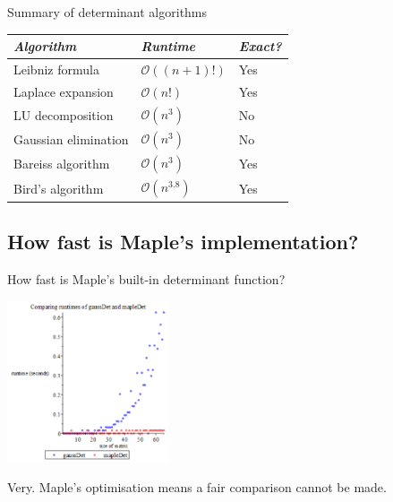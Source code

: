 \documentclass{beamer}
\begin{document}
\begin{frame}{Summary of determinant algorithms}

    \begin{center}
        \begin{tabular}{l l l}
            \toprule
            \emph{Algorithm}     & \emph{Runtime}           & \emph{Exact?} \\
            \midrule
            Leibniz formula      & $\mathcal{O}((n+1)!)$    & Yes \\
            Laplace expansion    & $\mathcal{O}(n!)$        & Yes \\
            LU decomposition     & $\mathcal{O}(n^3)$       & No \\
            Gaussian elimination & $\mathcal{O}(n^3)$       & No \\
            Bareiss algorithm    & $\mathcal{O}(n^3)$       & Yes \\
            Bird's algorithm     & $\mathcal{O}(n^{3.8})$   & Yes \\
            \bottomrule
        \end{tabular}
    \end{center}

\end{frame}

\subsection{How fast is Maple's implementation?}

\begin{frame}{How fast is Maple's built-in determinant function?}

    \begin{center}{}
        \includegraphics[height=180]{gauss-maple}
    \end{center}

    Very. Maple's optimisation means a fair comparison cannot be made.

\end{frame}
\end{document}
